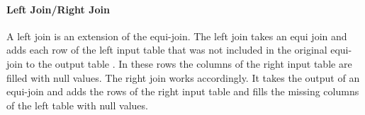 \paragraph{Left Join/Right Join}
A left join is an extension of the equi-join. The left join takes an equi join and adds each row of the left input table that was not included in the original equi-join to the output table . In these rows the columns of the right input table are filled with null values.
The right join works accordingly. It takes the output of an equi-join and adds the rows of the right input table and fills the missing columns of the left table with null values.

